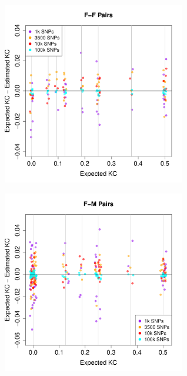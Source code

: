 \documentclass{beamer}
\begin{document}
\begin{frame}
\centering
\begin{figure}
\includegraphics[height=8cm]{../xchr_kc_estimatedVsTrue_FF_horizLines.pdf}
\end{figure}
\end{frame}


\begin{frame}
\centering
\begin{figure}
\includegraphics[height=8cm]{../xchr_kc_estimatedVsTrue_FM_horizLines.pdf}
\end{figure}
\end{frame}
\end{document}
